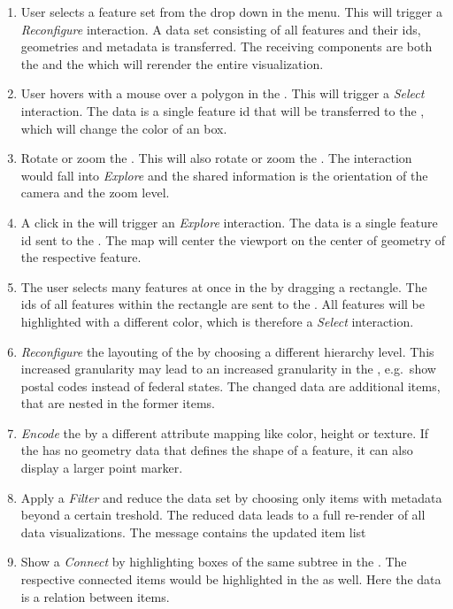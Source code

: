     \begin{enumerate}
      \item
        User selects a feature set from the drop down in the menu. This will trigger a \emph{Reconfigure} interaction. A data set consisting of all features and their ids, geometries and metadata is transferred. The receiving components are both the \tmap{} and the \map{} which will rerender the entire visualization.
      \item
        User hovers with a mouse over a polygon in the \map{}. This will trigger a \emph{Select} interaction. The data is a single feature id that will be transferred to the \tmap{}, which will change the color of an box.
      \item
        Rotate or zoom the \tmap{}. This will also rotate or zoom the \map{}. The interaction would fall into \emph{Explore} and the shared information is the orientation of the camera and the zoom level.
      \item
        A click in the \tmap{} will trigger an \emph{Explore} interaction. The data is a single feature id sent to the \map{}. The map will center the viewport on the center of geometry of the respective feature.
      \item
        The user selects many features at once in the \map{} by dragging a rectangle. The ids of all features within the rectangle are sent to the \tmap{}. All features will be highlighted with a different color, which is therefore a \emph{Select} interaction.
      \item
        \emph{Reconfigure} the layouting of the \tmap{} by choosing a different hierarchy level. This increased granularity may lead to an increased granularity in the \map{}, e.g.\ show postal codes instead of federal states. The changed data are additional items, that are nested in the former items.
      \item
        \emph{Encode} the \tmap{} by a different attribute mapping like color, height or texture. If the \map{} has no geometry data that defines the shape of a feature, it can also display a larger point marker.
      \item
        Apply a \emph{Filter} and reduce the data set by choosing only items with metadata beyond a certain treshold. The reduced data leads to a full re-render of all data visualizations. The message contains the updated item list
  \item
    Show a \emph{Connect} by highlighting boxes of the same subtree in the \tmap{}. The respective connected items would be highlighted in the \map{} as well. Here the data is a relation between items.
    \end{enumerate}

